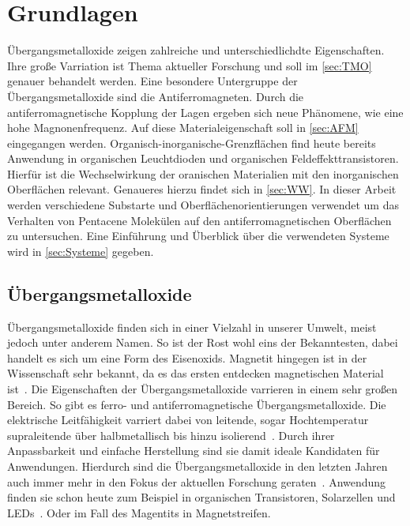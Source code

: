\chapter{Grundlagen}
    Übergangsmetalloxide zeigen zahlreiche und unterschiedlichdte Eigenschaften.
    Ihre große Varriation ist Thema aktueller Forschung und soll im \autoref{sec:TMO} genauer behandelt werden.
    Eine besondere Untergruppe der Übergangsmetalloxide sind die Antiferromagneten.
    Durch die antiferromagnetische Kopplung der Lagen ergeben sich neue Phänomene, wie eine hohe Magnonenfrequenz.
    Auf diese Materialeigenschaft soll in \autoref{sec:AFM} eingegangen werden.
    Organisch-inorganische-Grenzflächen find heute bereits Anwendung in organischen Leuchtdioden und organischen Feldeffekttransistoren.
    Hierfür ist die Wechselwirkung der oranischen Materialien mit den inorganischen Oberflächen relevant.
    Genaueres hierzu findet sich in \autoref{sec:WW}.
    In dieser Arbeit werden verschiedene Substarte und Oberflächenorientierungen verwendet um das Verhalten von Pentacene Molekülen auf den antiferromagnetischen Oberflächen zu untersuchen.
    Eine Einführung und Überblick über die verwendeten Systeme wird in \autoref{sec:Systeme} gegeben.
    

    \section{Übergangsmetalloxide} \label{sec:TMO}
        Übergangsmetalloxide finden sich in einer Vielzahl in unserer Umwelt, meist jedoch unter anderem Namen.
        So ist der Rost wohl eins der Bekanntesten, dabei handelt es sich um eine Form des Eisenoxids.
        Magnetit hingegen ist in der Wissenschaft sehr bekannt, da es das ersten entdecken magnetischen Material ist~\cite{Magnetit}.
        Die Eigenschaften der Übergangsmetalloxide varrieren in einem sehr großen Bereich.
        So gibt es ferro- und antiferromagnetische Übergangsmetalloxide.
        Die elektrische Leitfähigkeit varriert dabei von leitende, sogar Hochtemperatur supraleitende über halbmetallisch bis hinzu isolierend~\cite{IF_5}.
        Durch ihrer Anpassbarkeit und einfache Herstellung sind sie damit ideale Kandidaten für Anwendungen.
        Hierdurch sind die Übergangsmetalloxide in den letzten Jahren auch immer mehr in den Fokus der aktuellen Forschung geraten~\cite{IF_6, parkinson_iron_2016, cornell_iron_2003}.
        Anwendung finden sie schon heute zum Beispiel in organischen Transistoren, Solarzellen und LEDs~\cite{IF_3}.
        Oder im Fall des Magentits in Magnetstreifen.

